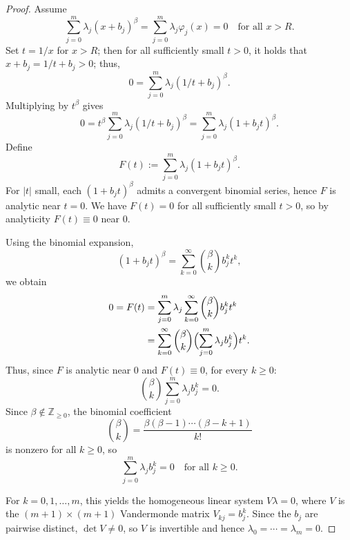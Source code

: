 \documentclass{article}
\theoremstyle{plain}
\theoremstyle{definition}
\theoremstyle{remark}
\begin{document}
\begin{proof}
	Assume
	\[
	\sum_{j=0}^m \lambda_j (x+b_j)^\beta = \sum_{j=0}^m \lambda_j \varphi_j(x) =0
	\quad\text{for all } x>R.
	\]
	Set $t = 1/x$ for $x>R$; then for all sufficiently small $t>0$,
	it holds that $x+b_j = 1/t + b_j > 0$; thus,
	\[
	0 = \sum_{j=0}^m \lambda_j (1/t + b_j)^\beta.
	\]
	Multiplying by $t^\beta$ gives
	\[
	0
	= t^\beta \sum_{j=0}^m \lambda_j (1/t + b_j)^\beta
	= \sum_{j=0}^m \lambda_j (1 + b_j t)^\beta.
	\]
	Define
	\[
	F(t) := \sum_{j=0}^m \lambda_j (1 + b_j t)^\beta.
	\]
	For $|t|$ small, each $(1 + b_j t)^\beta$ admits a convergent binomial
	series, hence $F$ is analytic near $t=0$. We have $F(t)=0$ for all
	sufficiently small $t>0$, so by analyticity $F(t)\equiv 0$ near $0$.
	
	Using the binomial expansion,
	\[
	(1 + b_j t)^\beta
	= \sum_{k=0}^\infty \binom{\beta}{k} b_j^k t^k,
	\]
	we obtain
	\begin{align*}
		0 = F(t)
		&= \sum_{j=0}^m \lambda_j \sum_{k=0}^\infty
		\binom{\beta}{k} b_j^k t^k \\
		&= \sum_{k=0}^\infty
		\binom{\beta}{k}\Bigl(\sum_{j=0}^m \lambda_j b_j^k\Bigr) t^k.
	\end{align*}
Thus, since $F$ is analytic near $0$ and $F(t)\equiv 0$, for every $k\ge 0$:
\[
\binom{\beta}{k} \sum_{j=0}^m \lambda_j b_j^k = 0.
\]
Since $\beta\notin\mathbb{Z}_{\ge 0}$, the binomial coefficient
\[
\binom{\beta}{k}
= \frac{\beta(\beta-1)\cdots(\beta-k+1)}{k!}
\]
is nonzero for all $k\ge 0$, so
	\[
	\sum_{j=0}^m \lambda_j b_j^k = 0
	\quad\text{for all } k\ge 0.
	\]
	
	For $k=0,1,\dots,m$, this yields the homogeneous linear system
	$V\lambda = 0$, where $V$ is the $(m+1)\times(m+1)$ Vandermonde matrix
	$V_{kj} = b_j^k$. Since the $b_j$ are pairwise distinct, $\det V\neq 0$,
	so $V$ is invertible and hence $\lambda_0=\cdots=\lambda_m=0$.
\end{proof}
\end{document}
